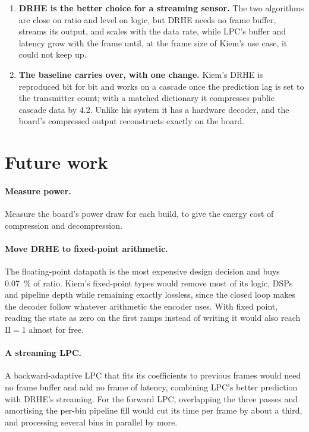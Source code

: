 \begin{enumerate}
\item \textbf{DRHE is the better choice for a streaming sensor.} The two
algorithms are close on ratio and level on logic, but DRHE needs no frame
buffer, streams its output, and scales with the data rate, while LPC's buffer
and latency grow with the frame until, at the frame size of Kiem's use case, it
could not keep up.

\item \textbf{The baseline carries over, with one change.} Kiem's DRHE is
reproduced bit for bit and works on a cascade once the prediction lag is set to
the transmitter count; with a matched dictionary it compresses public cascade
data by \num{4.2}. Unlike his system it has a hardware decoder, and the
board's compressed output reconstructs exactly on the board.
\end{enumerate}

\section{Future work}
\label{sec:futurework}

\paragraph{Measure power.} Measure the board's power draw for each build, to
give the energy cost of compression and decompression.

\paragraph{Move DRHE to fixed-point arithmetic.} The floating-point datapath is
the most expensive design decision and buys \SI{0.07}{\percent} of ratio.
Kiem's fixed-point types would remove most of its logic, DSPs and pipeline
depth while remaining exactly lossless, since the closed loop makes the decoder
follow whatever arithmetic the encoder uses. With fixed point, reading the state
as zero on the first ramps instead of writing it would also reach
$\mathrm{II} = 1$ almost for free.

\paragraph{A streaming LPC.} A backward-adaptive LPC that fits its coefficients
to previous frames would need no frame buffer and add no frame of latency,
combining LPC's better prediction with DRHE's streaming. For the forward LPC,
overlapping the three passes and amortising the per-bin pipeline fill would
cut its time per frame by about a third, and processing several bins in
parallel by more.

